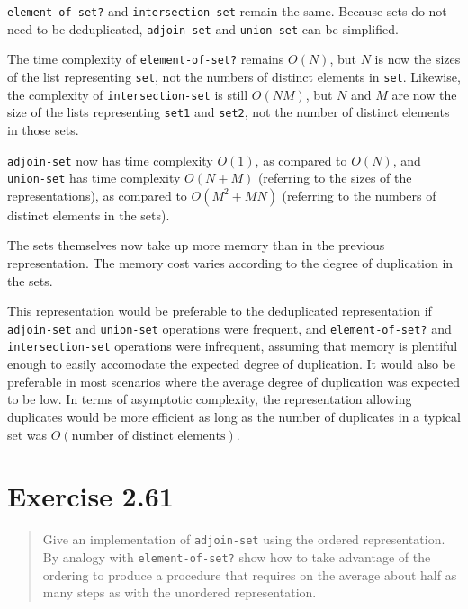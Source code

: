 \documentclass{article}
\begin{document}
\texttt{element-of-set?} and \texttt{intersection-set} remain the same. Because
sets do not need to be deduplicated, \texttt{adjoin-set} and \texttt{union-set}
can be simplified.




The time complexity of \texttt{element-of-set?} remains $O(N)$, but $N$ is now
the sizes of the list representing \texttt{set}, not the numbers of distinct
elements in \texttt{set}. Likewise, the complexity of \texttt{intersection-set}
is still $O(NM)$, but $N$ and $M$ are now the size of the lists representing
\texttt{set1} and \texttt{set2}, not the number of distinct elements in those
sets.

\texttt{adjoin-set} now has time complexity $O(1)$, as compared to $O(N)$, and
\texttt{union-set} has time complexity $O(N+M)$ (referring to the sizes of the
representations), as compared to $O(M^2 + MN)$ (referring to the numbers of
distinct elements in the sets).

The sets themselves now take up more memory than in the previous representation.
The memory cost varies according to the degree of duplication in the sets.

This representation would be preferable to the deduplicated representation if
\texttt{adjoin-set} and \texttt{union-set} operations were frequent, and
\texttt{element-of-set?} and \texttt{intersection-set} operations were
infrequent, assuming that memory is plentiful enough to easily accomodate the
expected degree of duplication. It would also be preferable in most scenarios
where the average degree of duplication was expected to be low. In terms of
asymptotic complexity, the representation allowing duplicates would be more
efficient as long as the number of duplicates in a typical set was
$O(\textrm{number of distinct elements})$.

\section{Exercise 2.61}
\begin{quote}
    Give an implementation of \texttt{adjoin-set} using the ordered
    representation. By analogy with \texttt{element-of-set?} show how to take
    advantage of the ordering to produce a procedure that requires on the
    average about half as many steps as with the unordered representation.
\end{quote}
\end{document}
